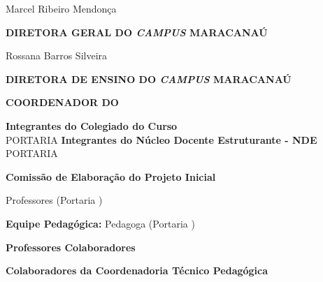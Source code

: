 \begin{center}
\noindent Marcel Ribeiro Mendonça

\vspace{0,25cm}

\noindent\textbf{\MakeUppercase{Diretora Geral do \textit{Campus} Maracanaú}}


\noindent Rossana Barros Silveira

\vspace{0,25cm}


\noindent\textbf{\MakeUppercase{Diretora de Ensino do \textit{Campus} Maracanaú}}



\vspace{0,25cm}

\noindent\textbf{\MakeUppercase{Coordenador do \NOMECURSO}}


\noindent \COORDENADORCURSO
\null
\end{center}

\clearpage
\begin{center}
\textbf{Integrantes do Colegiado do Curso}\\
\vspace{0.5cm}
PORTARIA \PORTARIACOLEGIADOATUAL
\vspace{0.5cm}
\COLEGIADO
\newpage 
\textbf{Integrantes do Núcleo Docente Estruturante - NDE}\\
\vspace{0.5cm}
PORTARIA \PORTARIANDEATUAL
\vspace{0.5cm}
\NDE


\pagebreak
\vspace{1cm}

\textbf{Comissão de Elaboração do Projeto Inicial}

\vspace{0.5cm}
Professores (Portaria \PORTARIACOMISSAO)
\vspace{0.5cm}

\MakeUppercase{\COMISSAO}

\vspace{0.5cm}
\vspace{1cm}
\textbf{Equipe Pedagógica:}
Pedagoga (Portaria \PORTARIACOMISSAOALT)
\vspace{0.5cm}

\MakeUppercase{\PEDAGOGO}

\vspace{1cm}
\textbf{Professores Colaboradores}

\MakeUppercase{\COLABORADORES}

\vspace{1cm}
\textbf{Colaboradores da Coordenadoria Técnico Pedagógica}

\MakeUppercase{\PEDAGOGOS}
\end{center}